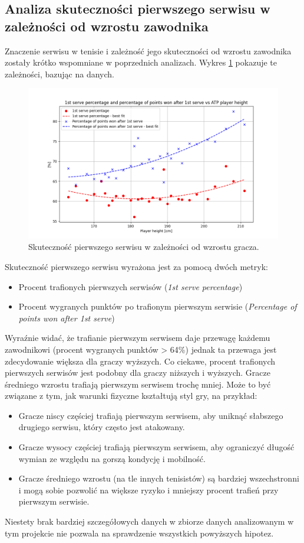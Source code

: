 \documentclass[12pt, a4paper]{article}
\begin{document}
\subsection{Analiza skuteczności pierwszego serwisu w zależności od wzrostu zawodnika}
Znaczenie serwisu w tenisie i zależność jego skuteczności od wzrostu zawodnika zostały krótko wspomniane w poprzednich analizach. Wykres \ref{fig:serve_height} pokazuje te zależności, bazując na danych.
\begin{figure}[h]
    \includegraphics[width=\textwidth]{figures/serve_height.png}
    \caption{Skuteczność pierwszego serwisu w zależności od wzrostu gracza.}
    \label{fig:serve_height}
\end{figure}
Skuteczność pierwszego serwisu wyrażona jest za pomocą dwóch metryk:
\begin{itemize}
    \item Procent trafionych pierwszych serwisów (\textit{1st serve percentage})
    \item Procent wygranych punktów po trafionym pierwszym serwisie (\textit{Percentage of points won after 1st serve})
\end{itemize}
Wyraźnie widać, że trafianie pierwszym serwisem daje przewagę każdemu zawodnikowi (procent wygranych punktów > 64\%) jednak ta przewaga jest zdecydowanie większa dla graczy wyższych. Co ciekawe, procent trafionych pierwszych serwisów jest podobny dla graczy niższych i wyższych. Gracze średniego wzrostu trafiają pierwszym serwisem trochę mniej. Może to być związane z tym, jak warunki fizyczne kształtują styl gry, na przykład:
\begin{itemize}
    \item Gracze niscy częściej trafiają pierwszym serwisem, aby uniknąć słabszego drugiego serwisu, który często jest atakowany.
    \item Gracze wysocy częściej trafiają pierwszym serwisem, aby ograniczyć długość wymian ze względu na gorszą kondycję i mobilność.
    \item Gracze średniego wzrostu (na tle innych tenisistów) są bardziej wszechstronni i mogą sobie pozwolić na większe ryzyko i mniejszy procent trafień przy pierwszym serwisie.
\end{itemize}
Niestety brak bardziej szczegółowych danych w zbiorze danych analizowanym w tym projekcie nie pozwala na sprawdzenie wszystkich powyższych hipotez.
\end{document}
